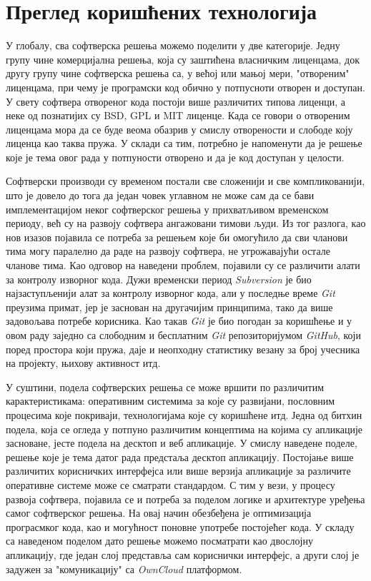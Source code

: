 \chapter{Преглед коришћених технологија}
\label{chap:Pregled koriscenih tehnologija}

У глобалу, сва софтверска решења можемо поделити у две категорије. Једну групу чине комерцијална решења, која су заштићена власничким лиценцама, док другу групу чине софтверска решења са, у већој или мањој мери, "отвореним" лиценцама, при чему је програмски код обично у потпусноти отворен и доступан. У свету софтвера отвореног кода постоји више различитих типова лиценци, а неке од познатијих су BSD, GPL и MIT\cite{licence} лиценце. Када се говори о отвореним лиценцама мора да се буде веома обазрив у смислу отворености и слободе коју лиценца као таква пружа. У склади са тим, потребно је напоменути да је решење које је тема овог рада у потпуности отворено и да је код доступан у целости. 

Софтверски производи су временом постали све сложенији и све компликованији, што је довело до тога да један човек углавном не може сам да се бави имплементацијом неког софтверског решења у прихватљивом временском периоду, већ су на развоју софтвера ангажовани тимови људи. Из тог разлога, као нов изазов појавила се потреба за решењем које би омогућило да сви чланови тима могу паралелно да раде на развоју софтвера, не угрожавајући остале чланове тима. Као одговор на наведени проблем, појавили су се различити алати за контролу изворног кода. Дужи временски период \textit{Subversion} је био најзаступљенији алат за контролу изворног кода, али у последње време \textit{Git}\cite{git} преузима примат, јер је заснован на другачијим принципима, тако да више задовољава потребе корисника. Као такав \textit{Git} је био погодан за коришћење и у овом раду заједно са слободним и бесплатним \textit{Git} репозиторијумом \textit{GitHub}\cite{github}, који поред простора који пружа, даје и неопходну статистику везану за број учесника на пројекту, њихову активност итд.

У суштини, подела софтверских решења се може  вршити по различитим карактеристикама: оперативним системима за које су развијани, пословним процесима које покриваји, технологијама које су коришћене итд. Једна од битхин подела, која се огледа у потпуно различитим концептима на којима су апликације засноване, јесте подела на десктоп и веб апликације. У смислу наведене поделе, решење које је тема датог рада предстаља десктоп апликацију. Постојање више различитих корисничких интерфејса или више верзија апликације за различите оперативне системе може се сматрати стандардом. С тим у вези, у процесу развоја софтвера, појавила се и потреба за поделом логике и архитектуре уређења самог софтверског решења. На овај начин обезбеђена је оптимизација програсмког кода, као и могућност поновне употребе постојећег кода. У складу са наведеном поделом дато решење можемо посматрати као двослојну апликацију, где један слој представља сам кориснички интерфејс, а други слој је задужен за "комуникацију" са \textit{OwnCloud} платформом. 

